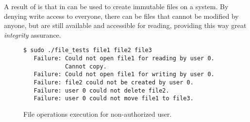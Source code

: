 \par A result of  is that in can be used to create immutable files on a system. By denying write access to everyone, there can be files that cannot be modified by anyone, but are still available and accessible for reading, providing this way great \emph{integrity} assurance.

\begin{figure}[ht]
	\centering
	\footnotesize{\selectfont 
		\begin{lstlisting}
$ sudo ./file_tests file1 file2 file3
   Failure: Could not open file1 for reading by user 0. 
            Cannot copy.
   Failure: Could not open file1 for writing by user 0.
   Failure: file2 could not be created by user 0.
   Failure: user 0 could not delete file2.
   Failure: user 0 could not move file1 to file3.

		\end{lstlisting}}
	\caption{File operations execution for non-authorized user.}
	\label{fig:results2}
\end{figure}




